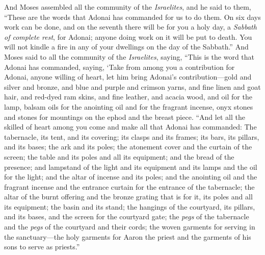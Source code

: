 \begin{biblechapter} %
 And Moses assembled all the community of the \textit{Israelites}, and he said to them, “These are the words that Adonai has commanded for us to do them.
\verse On six days work can be done, and on the seventh there will be for you a holy day, a \textit{Sabbath of complete rest}, for Adonai; anyone doing work on it will be put to death.
\verse You will not kindle a fire in any of your dwellings on the day of the Sabbath.”
\verse And Moses said to all the community of the \textit{Israelites}, saying, “This is the word that Adonai has commanded, saying,
\verse ‘Take from among you a contribution for Adonai, anyone willing of heart, let him bring Adonai’s contribution—gold and silver and bronze,
\verse and blue and purple and crimson yarns, and fine linen and goat hair,
\verse and red-dyed ram skins, and fine leather, and acacia wood,
\verse and oil for the lamp, balsam oils for the anointing oil and for the fragrant incense,
\verse onyx stones and stones for mountings on the ephod and the breast piece.
\verse “And let all the skilled of heart among you come and make all that Adonai has commanded:
\verse The tabernacle, its tent, and its covering; its clasps and its frames; its bars, its pillars, and its bases;
\verse the ark and its poles; the atonement cover and the curtain of the screen;
\verse the table and its poles and all its equipment; and the bread of the presence;
\verse and lampstand of the light and its equipment and its lamps and the oil for the light;
\verse and the altar of incense and its poles; and the anointing oil and the fragrant incense and the entrance curtain for the entrance of the tabernacle;
\verse the altar of the burnt offering and the bronze grating that is for it, its poles and all its equipment; the basin and its stand;
\verse the hangings of the courtyard, its pillars, and its bases, and the screen for the courtyard gate;
\verse the \textit{pegs} of the tabernacle and the \textit{pegs} of the courtyard and their cords;
\verse the woven garments for serving in the sanctuary—the holy garments for Aaron the priest and the garments of his sons to serve as priests.”

\end{biblechapter}
